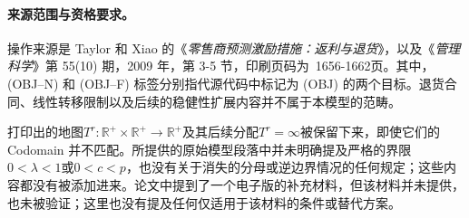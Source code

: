 \documentclass{article}
\begin{document}
\paragraph{来源范围与资格要求。}
操作来源是 Taylor 和 Xiao 的《\emph{零售商预测激励措施：返利与退货}》，以及《\emph{管理科学}》第 55(10) 期，2009 年，第 3-5 节，印刷页码为~1656-1662页。其中，(OBJ--N) 和 (OBJ--F) 标签分别指代源代码中标记为 (OBJ) 的两个目标。退货合同、线性转移限制以及后续的稳健性扩展内容并不属于本模型的范畴。

打印出的地图$T^r:\mathbb R^+\times\mathbb R^+\to\mathbb R^+$及其后续分配$T^r=\infty$被保留下来，即使它们的 Codomain 并不匹配。所提供的原始模型段落中并未明确提及严格的界限$0<\lambda<1$或$0<c<p$，也没有关于消失的分母或逆边界情况的任何规定；这些内容都没有被添加进来。论文中提到了一个电子版的补充材料，但该材料并未提供，也未被验证；这里也没有提及任何仅适用于该材料的条件或替代方案。
\end{document}
